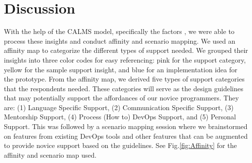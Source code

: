 \documentclass{sigchi}
\begin{document}
\section{Discussion}
With the help of the CALMS model, specifically the factors , we were able to process these insights and conduct affinity and scenario mapping. We used an affinity map to categorize the different types of support needed. %
We grouped their insights into three color codes for easy referencing: pink for the support category, yellow for the sample support insight, and blue for an implementation idea for the prototype. From the affinity map, we derived five types of support categories that the respondents needed. These categories will serve as the design guidelines that may potentially support the affordances of our novice programmers. They are: (1) Language Specific Support, (2) Communication Specific Support, (3) Mentorship Support, (4) Process (How to) DevOps Support, and (5) Personal Support. This was followed by a scenario mapping session where we brainstormed on features from existing DevOps tools and other features that can be augmented to provide novice support based on the guidelines. See Fig.\ref{fig:Affinity} for the affinity and scenario map used. 
\end{document}
